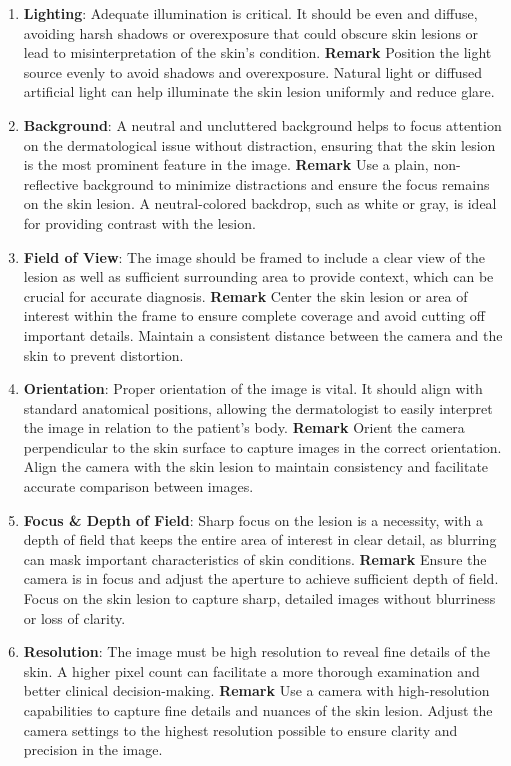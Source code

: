 \begin{enumerate}
    \item \textbf{Lighting}:  Adequate illumination is critical. It should be even and diffuse, avoiding harsh shadows or overexposure that could obscure skin lesions or lead to misinterpretation of the skin's condition. \textbf{Remark} Position the light source evenly to avoid shadows and overexposure. Natural light or diffused artificial light can help illuminate the skin lesion uniformly and reduce glare.
    \item \textbf{Background}: A neutral and uncluttered background helps to focus attention on the dermatological issue without distraction, ensuring that the skin lesion is the most prominent feature in the image. \textbf{Remark} Use a plain, non-reflective background to minimize distractions and ensure the focus remains on the skin lesion. A neutral-colored backdrop, such as white or gray, is ideal for providing contrast with the lesion.
    \item \textbf{Field of View}: The image should be framed to include a clear view of the lesion as well as sufficient surrounding area to provide context, which can be crucial for accurate diagnosis. \textbf{Remark} Center the skin lesion or area of interest within the frame to ensure complete coverage and avoid cutting off important details. Maintain a consistent distance between the camera and the skin to prevent distortion.
    \item \textbf{Orientation}: Proper orientation of the image is vital. It should align with standard anatomical positions, allowing the dermatologist to easily interpret the image in relation to the patient's body. \textbf{Remark} Orient the camera perpendicular to the skin surface to capture images in the correct orientation. Align the camera with the skin lesion to maintain consistency and facilitate accurate comparison between images.
    \item \textbf{Focus \& Depth of Field}: Sharp focus on the lesion is a necessity, with a depth of field that keeps the entire area of interest in clear detail, as blurring can mask important characteristics of skin conditions. \textbf{Remark} Ensure the camera is in focus and adjust the aperture to achieve sufficient depth of field. Focus on the skin lesion to capture sharp, detailed images without blurriness or loss of clarity.
    \item \textbf{Resolution}: The image must be high resolution to reveal fine details of the skin. A higher pixel count can facilitate a more thorough examination and better clinical decision-making. \textbf{Remark} Use a camera with high-resolution capabilities to capture fine details and nuances of the skin lesion. Adjust the camera settings to the highest resolution possible to ensure clarity and precision in the image.

\end{enumerate}
